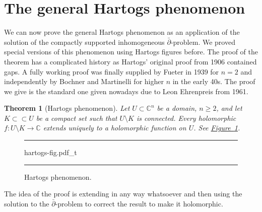 \documentclass[12pt,openany]{book}
\newcommand{\C}{{\mathbb{C}}}
\theoremstyle{plain}
\newtheorem{thm}{Theorem}[section]
\theoremstyle{remark}
\theoremstyle{definition}
\newenvironment{myfig}{%
\begin{figure}[h!t]
\noindent\rule{\textwidth}{0.5pt}\vspace{12pt}\par\centering}%
{\par\noindent\rule{\textwidth}{0.5pt}
\end{figure}}
\theoremstyle{exercise}
\theoremstyle{example}
\newcommand{\figureref}[1]{\hyperref[#1]{Figure~\ref*{#1}}}
\begin{document}

\section{The general Hartogs phenomenon}
\label{sec:hartogsphenom}

We can now prove the general Hartogs phenomenon as an application of the
solution of the compactly supported
inhomogeneous $\bar{\partial}$-problem.  We proved special
versions of this phenomenon using Hartogs figures before.
The proof of the theorem has a complicated history as
Hartogs' original proof from 1906 contained gaps.
A fully working proof was finally supplied by Fueter in 1939 for $n=2$
and independently by Bochner and Martinelli for higher $n$
in the early 40s.
The proof we give is the
standard one given nowadays due to Leon Ehrenpreis from 1961.

\begin{thm}[Hartogs phenomenon]
Let $U \subset \C^n$ be a domain, $n \geq 2$, and let
$K \subset \subset U$ be a compact set such that
$U \setminus K$ is connected.  Every holomorphic $f \colon U \setminus K \to \C$
extends uniquely to a holomorphic function on $U$.
See \figureref{fig:hartogs-fig}.
\end{thm}

\begin{myfig}
{hartogs-fig.pdf_t}
\caption{Hartogs phenomenon.\label{fig:hartogs-fig}}
\end{myfig}

The idea of the proof is extending in any way whatsoever and then using the solution
to the $\bar{\partial}$-problem to correct the result to make it
holomorphic.
\end{document}
